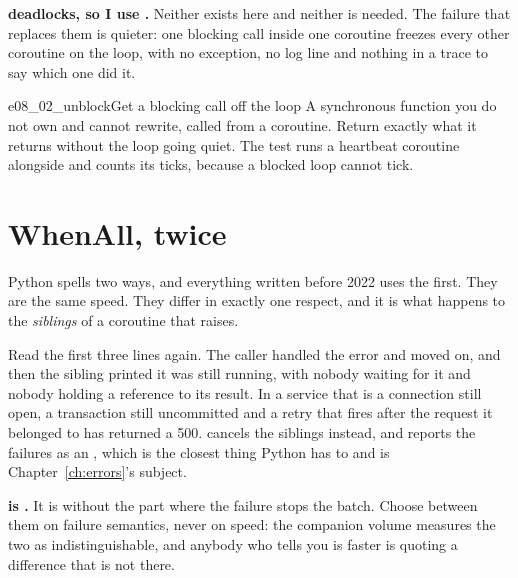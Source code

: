 \begin{trapbox}
\textbf{ deadlocks, so I use .}
Neither exists here and neither is needed. The failure that replaces them
is quieter: one blocking call inside one coroutine freezes every other
coroutine on the loop, with no exception, no log line and nothing in a
trace to say which one did it.
\end{trapbox}

\begin{exercise}{e08_02_unblock}{Get a blocking call off the loop}
A synchronous function you do not own and cannot rewrite, called from a
coroutine. Return exactly what it returns without the loop going quiet.
The test runs a heartbeat coroutine alongside and counts its ticks,
because a blocked loop cannot tick.
\end{exercise}

\section{WhenAll, twice}
\label{sec:asyncio-whenall}

Python spells  two ways, and everything written before
2022 uses the first. They are the same speed. They differ in exactly one
respect, and it is what happens to the \emph{siblings} of a coroutine that
raises.



\noindent
Read the first three lines again. The caller handled the error and moved
on, and then the sibling printed \dash{} it was still running, with nobody
waiting for it and nobody holding a reference to its result. In a service
that is a connection still open, a transaction still uncommitted and a
retry that fires after the request it belonged to has returned a 500.
 cancels the siblings instead, and reports the failures as
an , which is the closest thing Python has to
 and is Chapter~\ref{ch:errors}'s subject.

\begin{trapbox}
\textbf{ is .} It is  without
the part where the failure stops the batch. Choose between them on failure
semantics, never on speed: the companion volume measures the two as
indistinguishable, and anybody who tells you  is faster is
quoting a difference that is not there.
\end{trapbox}

